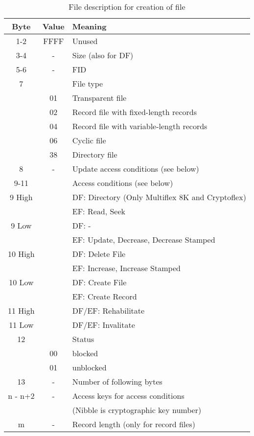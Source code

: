 \documentclass[a4paper,oneside]{article}
\begin{document}
\begin{table}[h!]
\caption{File description for creation of file}
\begin{center}
\begin{tabular}{|c|c|l|} \hline
Byte & Value & Meaning  \\ \hline \hline
1-2  &  FFFF  &  Unused  \\ \hline
3-4  &  -  &  Size (also for DF)  \\ \hline
5-6  &  -  &  FID  \\ \hline
7    &     &  File type  \\ \cline{2-3}
     &  01 &  Transparent file \\ \cline{2-3}
     &  02 &  Record file with fixed-length records \\ \cline{2-3}
     &  04 &  Record file with variable-length records \\ \cline{2-3}
     &  06 &  Cyclic file \\ \cline{2-3}
     &  38 &  Directory file  \\ \hline
8    &  -  &  Update access conditions (see below) \\ \hline
9-11 &     &  Access conditions (see below) \\ \hline
9 High &   &  DF: Directory (Only Multiflex 8K and Cryptoflex)\\
     &     &  EF: Read, Seek \\ \hline
9 Low &    &  DF: - \\
     &     &  EF: Update, Decrease, Decrease Stamped \\ \hline
10 High &  &  DF: Delete File \\
     &     &  EF: Increase, Increase Stamped \\\hline
10 Low &   &  DF: Create File \\
     &     &  EF: Create Record \\ \hline
11 High &  &  DF/EF: Rehabilitate \\ \hline
11 Low &   &  DF/EF: Invalitate \\ \hline
12   &     &  Status \\ \cline{2-3}
     &  00 &  blocked \\ \cline{2-3}
     &  01 &  unblocked \\ \hline
13   &  -  &  Number of following bytes \\ \hline
n - n+2 &- &  Access keys for access conditions \\
     &     &  (Nibble is cryptographic key number) \\ \hline
m    &  -  &  Record length (only for record files) \\ \hline
\end{tabular}
\end{center}
\end{table}
\end{document}
